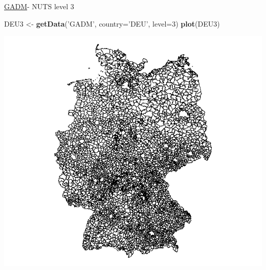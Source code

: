 \documentclass[ignorenonframetext,]{beamer}
\newenvironment{Shaded}{\begin{snugshade}}{\end{snugshade}}
\newcommand{\DataTypeTok}[1]{\textcolor[rgb]{0.13,0.29,0.53}{#1}}
\newcommand{\DecValTok}[1]{\textcolor[rgb]{0.00,0.00,0.81}{#1}}
\newcommand{\KeywordTok}[1]{\textcolor[rgb]{0.13,0.29,0.53}{\textbf{#1}}}
\newcommand{\NormalTok}[1]{#1}
\newcommand{\StringTok}[1]{\textcolor[rgb]{0.31,0.60,0.02}{#1}}
\begin{document}
\begin{frame}[fragile]{\href{http://www.gadm.org/}{GADM}- NUTS level 3}
\protect\hypertarget{gadm--nuts-level-3-1}{}

\begin{Shaded}
\begin{Highlighting}[]
\NormalTok{DEU3 <-}\StringTok{ }\KeywordTok{getData}\NormalTok{(}\StringTok{'GADM'}\NormalTok{, }\DataTypeTok{country=}\StringTok{'DEU'}\NormalTok{, }\DataTypeTok{level=}\DecValTok{3}\NormalTok{)}
\KeywordTok{plot}\NormalTok{(DEU3)}
\end{Highlighting}
\end{Shaded}

\includegraphics{figure/DEU3.png}

\end{frame}
\end{document}
